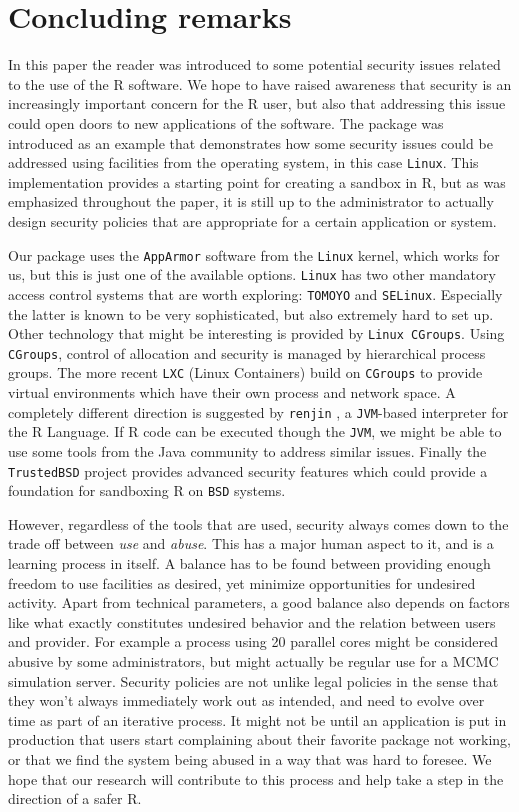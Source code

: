 \documentclass{jss}
\newcommand{\R}{\textsf{R}\xspace}
\newcommand{\Java}{\textsf{Java}\xspace}
\newcommand{\AppArmor}{\texttt{AppArmor}\xspace}
\newcommand{\RAppArmor}{\pkg{RAppArmor}\xspace}
\newcommand{\Linux}{\texttt{Linux}\xspace}
\begin{document}
\section{Concluding remarks}

In this paper the reader was introduced to some potential security issues
related to the use of the \R software. We hope to have raised
awareness that security is an increasingly important concern for the
\R user, but also that addressing this issue could open doors to new
applications of the software. The \RAppArmor package was introduced as an
example that demonstrates how some security issues could be addressed using
facilities from the operating system, in this case \Linux. This
implementation provides a starting point for creating a sandbox in \R,
but as was emphasized throughout the paper, it is still up to the administrator
to actually design security policies that are appropriate for a certain
application or system.

Our package uses the \AppArmor software from the \Linux kernel,
which works for us, but this is just one of the available options.
\Linux has two other mandatory access control systems that are worth
exploring: \texttt{TOMOYO} and \texttt{SELinux}. Especially the latter is known
to be very sophisticated, but also extremely hard to set up. Other
technology that might be interesting is provided by \texttt{Linux CGroups}.
Using \texttt{CGroups}, control of allocation and security is managed by
hierarchical process groups. The more recent \texttt{LXC} (Linux Containers)
build on \texttt{CGroups} to provide virtual environments which have their own
process and network space. A completely different direction is suggested by
\texttt{renjin} \citep{renjin}, a \texttt{JVM}-based interpreter for the R
Language. If \R code can be executed though the \texttt{JVM}, we might be able
to use some tools from the \Java community to address similar issues.
Finally the \texttt{TrustedBSD} project provides advanced security features
which could provide a foundation for sandboxing \R on \texttt{BSD} systems.

However, regardless of the tools that are used, security always comes down to
the trade off between \emph{use} and \emph{abuse}. This has a major human
aspect to it, and is a learning process in itself. A balance has to be found
between providing enough freedom to use facilities as desired, yet minimize
opportunities for undesired activity. Apart from technical parameters, a good
balance also depends on factors like what exactly constitutes undesired
behavior and the relation between users and provider. For example a process
using 20 parallel cores might be considered abusive by some
administrators, but might actually be regular use for a MCMC simulation
server. Security policies are not unlike legal policies in the sense that they
won't always immediately work out as intended, and need to evolve over time as
part of an iterative process. It might not be until an application is put in
production that users start complaining about their favorite package not
working, or that we find the system being abused in a way that was hard to
foresee. We hope that our research will contribute to this process and help
take a step in the direction of a safer \R.
\end{document}
